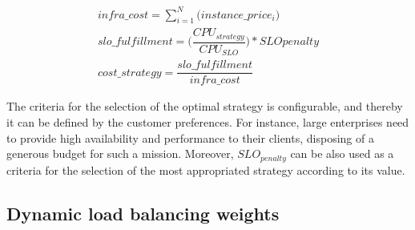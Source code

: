 {\scriptsize
\begin{equation}\label{strategy_cost}
\begin{split}
infra\_cost = \sum_{i=1}^N \big( instance\_price_{i} \big) \\
slo\_fulfillment =  \bigg( \dfrac{ CPU_{strategy} } {CPU_{SLO}} \bigg) * SLO penalty \\
cost\_strategy = \dfrac{  slo\_fulfillment  } {infra\_cost}
\end{split}
\end{equation}
}


The criteria for the selection of the optimal strategy is configurable, and thereby it can be defined by the customer preferences. For instance, large enterprises need to provide high availability and performance to their clients, disposing of a generous budget for such a mission. Moreover, \emph{$SLO_{penalty}$} can be also used as a criteria for the selection of the most appropriated strategy according to its value.





\subsection{Dynamic load balancing weights } 

